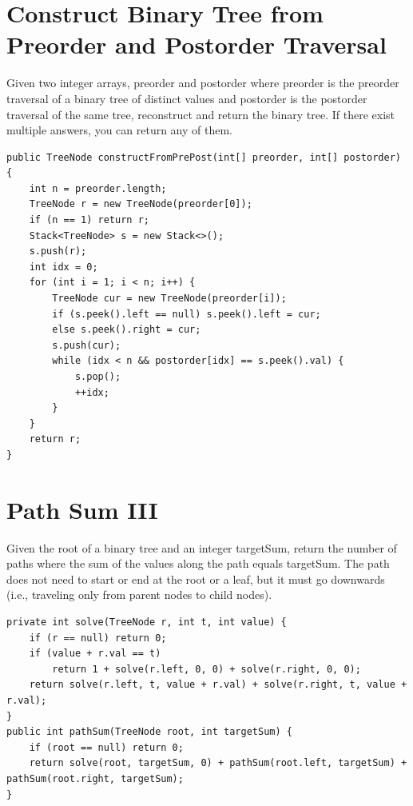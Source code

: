 \documentclass[9pt, b5paaper]{book}
\begin{document}
\section{Construct Binary Tree from Preorder and Postorder Traversal}
\label{sec-11-3}
Given two integer arrays, preorder and postorder where preorder is the preorder traversal of a binary tree of distinct values and postorder is the postorder traversal of the same tree, reconstruct and return the binary tree.
If there exist multiple answers, you can return any of them.
\begin{verbatim}
public TreeNode constructFromPrePost(int[] preorder, int[] postorder) {
    int n = preorder.length;
    TreeNode r = new TreeNode(preorder[0]);
    if (n == 1) return r;
    Stack<TreeNode> s = new Stack<>();
    s.push(r);
    int idx = 0;
    for (int i = 1; i < n; i++) {
        TreeNode cur = new TreeNode(preorder[i]);
        if (s.peek().left == null) s.peek().left = cur;
        else s.peek().right = cur;
        s.push(cur);
        while (idx < n && postorder[idx] == s.peek().val) {
            s.pop();
            ++idx;
        }
    }
    return r;
}
\end{verbatim}

\section{Path Sum III}
\label{sec-11-4}
Given the root of a binary tree and an integer targetSum, return the number of paths where the sum of the values along the path equals targetSum.
The path does not need to start or end at the root or a leaf, but it must go downwards (i.e., traveling only from parent nodes to child nodes).
\begin{verbatim}
private int solve(TreeNode r, int t, int value) {
    if (r == null) return 0;
    if (value + r.val == t)
        return 1 + solve(r.left, 0, 0) + solve(r.right, 0, 0);
    return solve(r.left, t, value + r.val) + solve(r.right, t, value + r.val);
}
public int pathSum(TreeNode root, int targetSum) {
    if (root == null) return 0;
    return solve(root, targetSum, 0) + pathSum(root.left, targetSum) + pathSum(root.right, targetSum);
}
\end{verbatim}
\end{document}
